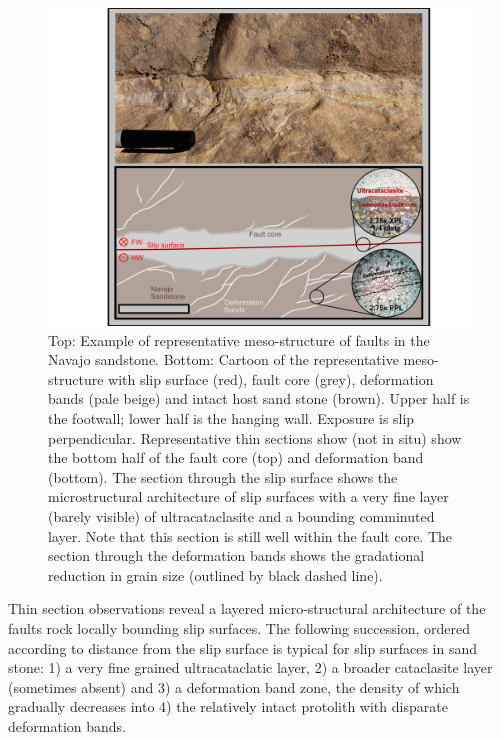 \documentclass[12pt,a4paper]{article}
\begin{document}
 \begin{figure}[h]
	\centering
		\includegraphics[width=1 \textwidth]{Fault_architecture_zoom}
	\caption{Top: Example of representative meso-structure of faults in the Navajo sandstone. Bottom: Cartoon of the representative meso-structure with slip surface (red), fault core (grey), deformation bands (pale beige) and intact host sand stone (brown). Upper half is the footwall; lower half is the hanging wall. Exposure is slip perpendicular. Representative thin sections show (not in situ) show the bottom half of the fault core (top) and deformation band (bottom). The section through the slip surface shows the microstructural architecture of slip surfaces with a very fine layer (barely visible) of ultracataclasite and a bounding comminuted layer. Note that this section is still well within the fault core. The section through the deformation bands shows the gradational reduction in grain size (outlined by black dashed line).}
	\label{DBC}
\end{figure}

	Thin section observations reveal a layered micro-structural architecture of the faults rock locally bounding slip surfaces. The following succession, ordered according to distance from the slip surface is typical for slip surfaces in sand stone:  1) a very fine grained ultracataclatic layer, 2) a broader cataclasite layer (sometimes absent) and 3) a deformation band zone, the density of which gradually decreases into 4) the relatively intact protolith with disparate deformation bands.

\end{document}
